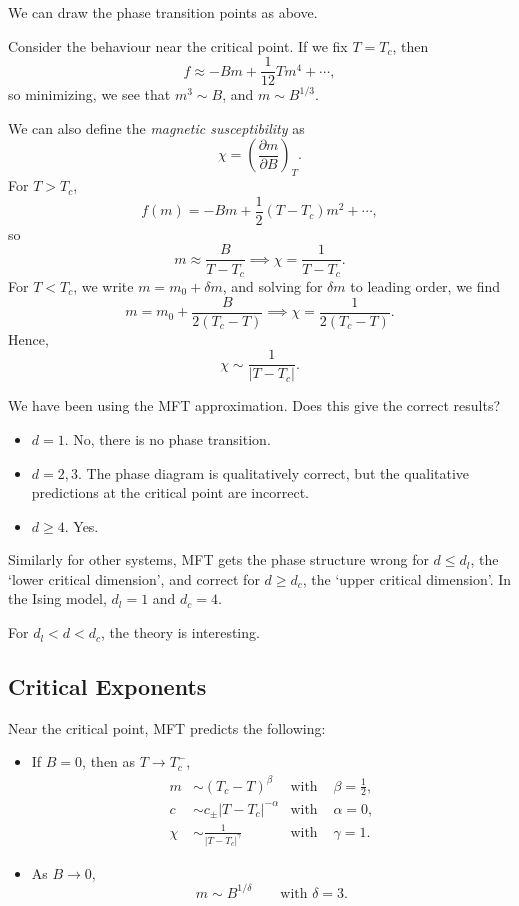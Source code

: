 \documentclass[12pt]{article}
\begin{document}
We can draw the phase transition points as above.


Consider the behaviour near the critical point. If we fix $T = T_c$, then
\[
f \approx - B m + \frac{1}{12} Tm^4 + \cdots,
\]
so minimizing, we see that $m^3 \sim B$, and $m \sim B^{1/3}$.

We can also define the \emph{magnetic susceptibility} as
\[
\chi = \left( \frac{\partial m}{\partial B} \right)_T.
\]
For $T > T_c$,
\[
f(m) = - Bm + \frac{1}{2} (T - T_c)m^2 + \cdots,
\]
so
\[
m \approx \frac{B}{T - T_c} \implies \chi = \frac{1}{T - T_c}.
\]
For $T < T_c$, we write $m = m_0 + \delta m$, and solving for $\delta m$ to leading order, we find
\[
m = m_0 + \frac{B}{2(T_c - T)} \implies \chi = \frac{1}{2(T_c - T)}.
\]
Hence,
\[
\chi \sim \frac{1}{|T-T_c|}.
\]

We have been using the MFT approximation. Does this give the correct results?
\begin{itemize}
	\item $d=1$. No, there is no phase transition.
	\item $d = 2, 3$. The phase diagram is qualitatively correct, but the qualitative predictions at the critical point are incorrect.
	\item $d \geq 4$. Yes.
\end{itemize}

Similarly for other systems, MFT gets the phase structure wrong for $d \leq d_l$, the `lower critical dimension', and correct for $d \geq d_c$, the `upper critical dimension'. In the Ising model, $d_l = 1$ and $d_c = 4$.

For $d_l < d < d_c$, the theory is interesting.

\subsection{Critical Exponents}%
\label{sub:ce}

Near the critical point, MFT predicts the following:
\begin{itemize}
	\item If $B = 0$, then as $T \to T_c^{-}$,
		\begin{align*}
			m &\sim (T_c - T)^\beta & \text{with } &\beta = \frac{1}{2}, \\
			c &\sim c_{\pm} |T - T_c|^{-\alpha} & \text{with } &\alpha = 0, \\
			\chi &\sim \frac{1}{|T - T_c|^\gamma} & \text{with } &\gamma = 1.
		\end{align*}
	\item As $B \to 0$,
		\[
			m \sim B^{1/\delta} \qquad \text{with } \delta = 3.
		\]
\end{itemize}
\end{document}
